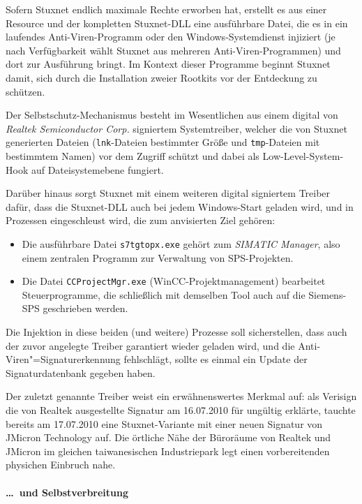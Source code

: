 Sofern Stuxnet endlich maximale Rechte erworben hat, erstellt es aus
einer Resource und der kompletten Stuxnet-DLL eine ausführbare Datei,
die es in ein laufendes Anti-Viren-Programm oder den
Windows-Systemdienst injiziert (je nach Verfügbarkeit wählt Stuxnet
aus mehreren Anti-Viren-Programmen) und dort zur Ausführung bringt. Im
Kontext dieser Programme beginnt Stuxnet damit, sich durch die
Installation zweier Rootkits vor der Entdeckung zu schützen.

Der Selbstschutz-Mechanismus besteht im Wesentlichen aus einem digital
von \textit{Realtek Semiconductor Corp.} signiertem Systemtreiber,
welcher die von Stuxnet generierten Dateien (\texttt{lnk}-Dateien
bestimmter Größe und \texttt{tmp}-Dateien mit bestimmtem Namen) vor
dem Zugriff schützt und dabei als Low-Level-System-Hook auf
Dateisystemebene fungiert.

Darüber hinaus sorgt Stuxnet mit einem weiteren digital signiertem
Treiber dafür, dass die Stuxnet-DLL auch bei jedem Windows-Start
geladen wird, und in Prozessen eingeschleust wird, die zum anvisierten
Ziel gehören:

\begin{itemize}
  \item Die ausführbare Datei \texttt{s7tgtopx.exe} gehört zum
\textit{SIMATIC Manager}, also einem zentralen Programm zur Verwaltung
von SPS-Projekten.
  \item Die Datei \texttt{CCProjectMgr.exe} (WinCC-Projektmanagement)
bearbeitet Steuerprogramme, die schließlich mit demselben Tool auch
auf die Siemens-SPS geschrieben werden.
\end{itemize}

Die Injektion in diese beiden (und weitere) Prozesse soll
sicherstellen, dass auch der zuvor angelegte Treiber garantiert wieder
geladen wird, und die Anti-Viren"=Signaturerkennung fehlschlägt,
sollte es einmal ein Update der Signaturdatenbank gegeben haben.

Der zuletzt genannte Treiber weist ein erwähnenswertes Merkmal auf:
als Verisign die von Realtek ausgestellte Signatur am 16.07.2010 für
ungültig erklärte, tauchte bereits am 17.07.2010 eine Stuxnet-Variante
mit einer neuen Signatur von JMicron Technology auf. Die örtliche Nähe
der Büroräume von Realtek und JMicron im gleichen taiwanesischen
Industriepark legt einen vorbereitenden physichen Einbruch nahe.

\paragraph{\dots\ und Selbstverbreitung}

